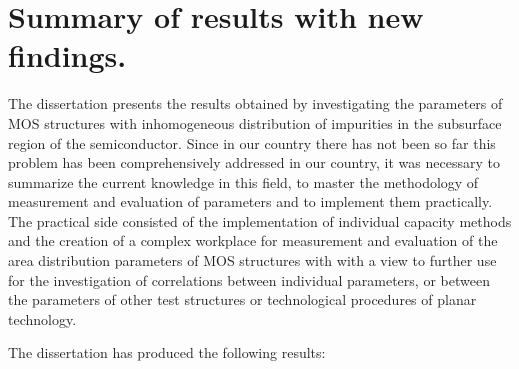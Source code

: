\chapter{Summary of results with new findings.}\label{Chapter8}

The dissertation presents the results obtained by investigating the
parameters of MOS structures with inhomogeneous distribution of
impurities in the subsurface region of the semiconductor. Since in our
country there has not been so far this problem has been
comprehensively addressed in our country, it was necessary to
summarize the current knowledge in this field, to master the
methodology of measurement and evaluation of parameters and to
implement them practically. The practical side consisted of the
implementation of individual capacity methods and the creation of a
complex workplace for measurement and evaluation of the area
distribution parameters of MOS structures with with a view to further
use for the investigation of correlations between individual
parameters, or between the parameters of other test structures or
technological procedures of planar technology.

The dissertation has produced the following results:

